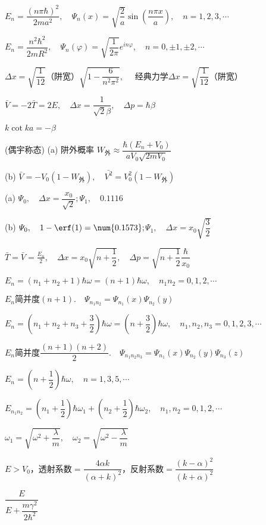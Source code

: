 \achapter


\answer $E_{n}=\dfrac{(n\pi\hbar)^{2}}{2ma^{2}},\quad \varPsi_{n}(x)=\sqrt{\dfrac{2}{a}}\sin\left(\dfrac{n\pi x}{a}\right),\quad n=1,2,3,\cdots$

\answer $E_{n}=\dfrac{n^{2}\hbar^{2}}{2mR^{2}},\quad \varPsi_{n}(\varphi)=\sqrt{\dfrac{1}{2\pi}}e^{in\varphi},\quad n=0,\pm1,\pm2,\cdots$

\answer $\Delta x=\sqrt{\dfrac{1}{12}}\text{（阱宽）}\sqrt{1-\dfrac{6}{n^{2}\pi^{2}}},\quad$ 经典力学$\Delta x=\sqrt{\dfrac{1}{12}}$（阱宽）

\answer $\bar{V}=-2\bar{T}=2E,\quad \Delta x=\dfrac{1}{\sqrt{2}\beta},\quad \Delta p=\hbar\beta$

\answer $k\cot ka=-\beta$


\answer (偶宇称态)	 (a) 阱外概率 $W_{\text{外}}\approx\dfrac{\hbar(E_{n}+V_{0})}{aV_{0}\sqrt{2mV_{0}}}$

	\qquad\qquad\quad	(b) $\bar{V}=-V_{0}(1-W_{\text{外}}),\quad \bar{V^{2}}=V_{0}^{2}(1-W_{\text{外}})$

\answer (a) $\varPsi_{0},\quad \Delta x=\dfrac{x_{0}}{\sqrt{2}};$\qquad $\varPsi_{1},\quad \num{0.1116}$

		(b) $\varPsi_{0},\quad 1-\erf(1)=\num{0.1573};$\quad $\varPsi_{1},\quad \Delta x=x_{0}\sqrt{\dfrac{3}{2}}$


\answer $\bar{T}=\bar{V}=\frac{E_{n}}{2},\quad \Delta x=x_{0}\sqrt{n+\dfrac{1}{2}},\quad \Delta p=\sqrt{n+\dfrac{1}{2}}\dfrac{\hbar}{x_{0}}$

\answer $E_{n}=(n_{1}+n_{2}+1)\hbar\omega=(n+1)\hbar\omega,\quad n_{1}n_{2}=0,1,2,\cdots$

$ E_{n}\text{简并度}(n+1).\quad \varPsi_{n_{1}n_{2}}=\varPsi_{n_{1}}(x)\varPsi_{n_{2}}(y) $

\answer $ E_{n}=\left(n_{1}+n_{2}+n_{3}+\dfrac{3}{2}\right)\hbar\omega=\left(n+\dfrac{3}{2}\right)\hbar\omega,\quad n_{1},n_{2},n_{3}=0,1,2,3,\cdots $

$ E_{n}\text{简并度}\dfrac{(n+1)(n+2)}{2}.\quad \varPsi_{n_{1}n_{2}n_{3}}=\varPsi_{n_{1}}(x)\varPsi_{n_{2}}(y)\varPsi_{n_{3}}(z) $

\answer $ E_{n}=\left(n+\dfrac{1}{2}\right)\hbar\omega,\quad n=1,3,5,\cdots $

\answer $ E_{n_{1}n_{2}}=\left(n_{1}+\dfrac{1}{2}\right)\hbar\omega_{1}+\left(n_{2}+\dfrac{1}{2}\right)\hbar\omega_{2},\quad n_{1},n_{2}=0,1,2,\cdots $

$\omega_{1}=\sqrt{\omega^{2}+\dfrac{\lambda}{m}},\quad \omega_{2}=\sqrt{\omega^{2}-\dfrac{\lambda}{m}}$

\answer $E>V_{0}$，透射系数$=\dfrac{4\alpha k}{(\alpha+k)^{2}}$，\quad 反射系数$=\dfrac{(k-\alpha)^{2}}{(k+\alpha)^{2}}$

\answer $\dfrac{E}{E+\dfrac{m\gamma^{2}}{2\hbar^{2}}}$

